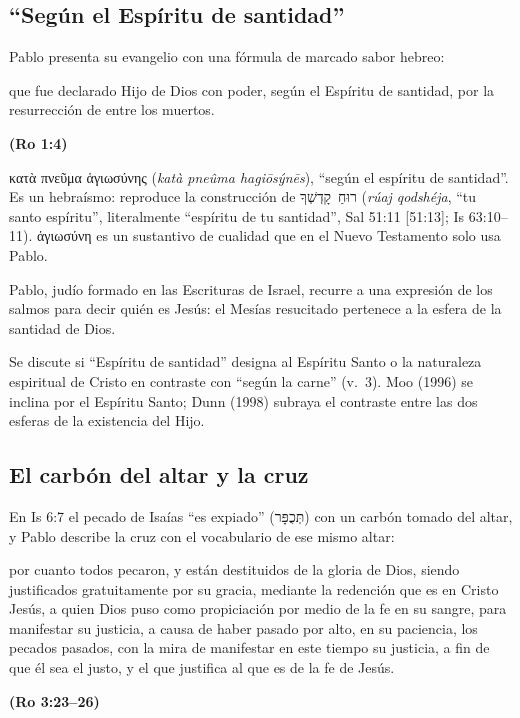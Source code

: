 \documentclass[11pt,letterpaper]{article}
\newcommand{\heb}[1]{\mbox{\foreignlanguage{hebrew}{#1}}}
\newcommand{\grc}[1]{\foreignlanguage{ancientgreek}{#1}}
\newcommand{\fuente}[1]{\par\hfill{\upshape\bfseries\small\textcolor{azul}{#1}}}
\begin{document}
\subsection{``Según el Espíritu de santidad''}
Pablo presenta su evangelio con una fórmula de marcado sabor hebreo:

\begin{cita}que fue declarado Hijo de Dios con poder, según el Espíritu de santidad, por la resurrección de entre los muertos.\fuente{(Ro 1:4)}\end{cita}

\begin{filologia}[Ro 1:4]
\grc{κατὰ πνεῦμα ἁγιωσύνης} (\emph{katà pneûma hagiōsýnēs}), ``según el espíritu de santidad''. Es un hebraísmo: reproduce la construcción de \heb{רוּחַ קָדְשְׁךָ} (\emph{rúaj qodshéja}, ``tu santo espíritu'', literalmente ``espíritu de tu santidad'', Sal 51:11 [51:13]; Is 63:10--11). \grc{ἁγιωσύνη} es un sustantivo de cualidad que en el Nuevo Testamento solo usa Pablo.
\end{filologia}

Pablo, judío formado en las Escrituras de Israel, recurre a una expresión de los salmos para decir quién es Jesús: el Mesías resucitado pertenece a la esfera de la santidad de Dios.

\begin{nota}[Precisión]
Se discute si ``Espíritu de santidad'' designa al Espíritu Santo o la naturaleza espiritual de Cristo en contraste con ``según la carne'' (v.~3). Moo (1996) se inclina por el Espíritu Santo; Dunn (1998) subraya el contraste entre las dos esferas de la existencia del Hijo.
\end{nota}

\subsection{El carbón del altar y la cruz}
En Is 6:7 el pecado de Isaías ``es expiado'' (\heb{תְּכֻפָּר}) con un carbón tomado del altar, y Pablo describe la cruz con el vocabulario de ese mismo altar:

\begin{cita}por cuanto todos pecaron, y están destituidos de la gloria de Dios, siendo justificados gratuitamente por su gracia, mediante la redención que es en Cristo Jesús, a quien Dios puso como propiciación por medio de la fe en su sangre, para manifestar su justicia, a causa de haber pasado por alto, en su paciencia, los pecados pasados, con la mira de manifestar en este tiempo su justicia, a fin de que él sea el justo, y el que justifica al que es de la fe de Jesús.\fuente{(Ro 3:23--26)}\end{cita}
\end{document}
